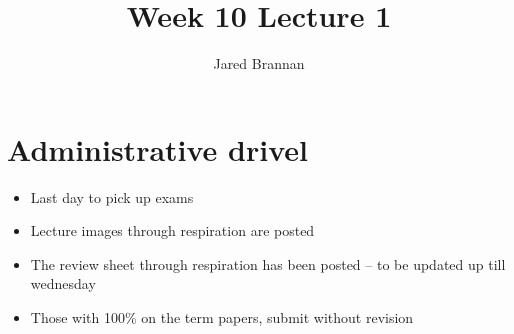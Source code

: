 \documentclass{article}
\title{Week 10 Lecture 1}
\author{Jared Brannan }
\theoremstyle{definition}
\begin{document}
\maketitle

\section{Administrative drivel}
\begin{itemize}
	\item  Last day to pick up exams
	\item Lecture images through respiration are posted
	\item The review sheet through respiration has been posted -- to be updated up till wednesday
	\item Those with 100\% on the term papers, submit without revision
\end{itemize}
\end{document}
